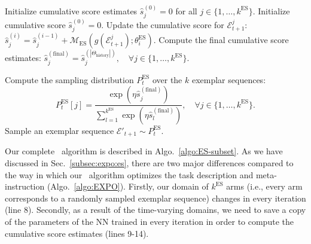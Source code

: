 \begin{algorithm}[H]
\begin{algorithmic}[1]
            \STATE Initialize cumulative score estimates \(\hat{s}_{j}^{(0)} = 0\) for all \(j \in \{1, \ldots, k^{\text{ES}}\}\). \qquad\qquad\qquad\qquad {}
                \STATE Initialize cumulative score \(\hat{s}_{j}^{(0)} = 0\).
                    \STATE Update the cumulative score for \(\mathcal{E}^j_{t+1}\): $\hat{s}_{j}^{(i)} = \hat{s}_{j}^{(i-1)} + \mathcal{M}_{\text{ES}}(g(\mathcal{E}^j_{t+1}); \theta^{\text{ES}}_{i})$.
                \ENDFOR
            \ENDFOR
            \STATE Compute the final cumulative score estimates: $\hat{s}_{j}^{(\text{final})} = \hat{s}_{j}^{(|\Theta_{\text{history}}|)}, \quad \forall j \in \{1, \ldots, k^{\text{ES}}\}$. 

            \STATE Compute the sampling distribution \(P_t^{\text{ES}}\) over the $k$ exemplar sequences:
            \[
            P_t^{\text{ES}}[j] = \frac{\exp(\eta \hat{s}_{j}^{(\text{final})})}{\sum_{l=1}^{k^{\text{ES}}} \exp(\eta \hat{s}_{l}^{(\text{final})})}, \quad \forall j \in \{1, \ldots, k^{\text{ES}}\}. \tag{5}
            \]
            \STATE Sample an exemplar sequence \(\mathcal{E}'_{t+1} \sim P_t^{\text{ES}}\).
        \ENDIF
    \ENDFOR
\end{algorithmic}
\caption{\alges}
\label{algo:ES-subset}
\end{algorithm}



Our complete \alges~algorithm is described in Algo.~\ref{algo:ES-subset}.
As we have discussed in Sec.~\ref{subsec:expo:es}, there are two major differences compared to the way in which our \alg~algorithm optimizes the task description and meta-instruction (Algo.~\ref{algo:EXPO}).
Firstly, our domain of $k^{\text{ES}}$ arms (i.e., every arm corresponds to a randomly sampled exemplar sequence) changes in every iteration (line 8).
Secondly, as a result of the time-varying domains, we need to save a copy of the parameters of the NN trained in every iteration in order to compute the cumulative score estimates (lines 9-14).

